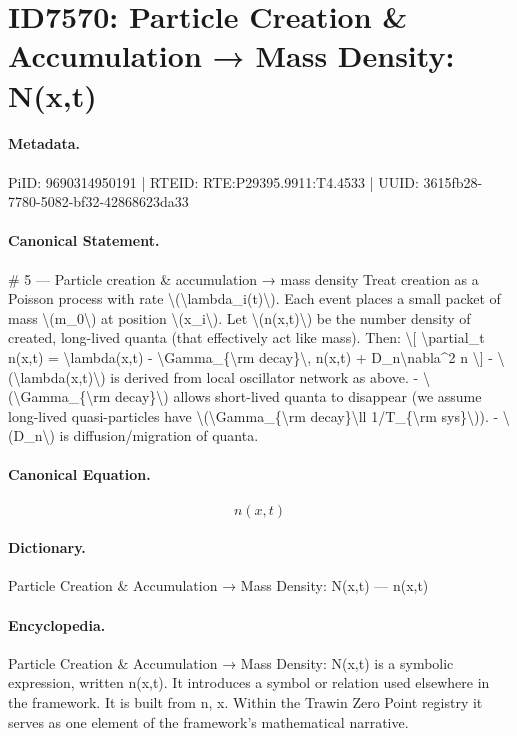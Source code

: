 \section*{ID7570: Particle Creation \& Accumulation → Mass Density: N(x,t)}
\paragraph{Metadata.}
PiID: 9690314950191 | RTEID: RTE:P29395.9911:T4.4533 | UUID: 3615fb28-7780-5082-bf32-42868623da33

\paragraph{Canonical Statement.}
\# 5 — Particle creation \& accumulation → mass density Treat creation as a Poisson process with rate \textbackslash{}(\textbackslash{}lambda\_i(t)\textbackslash{}). Each event places a small packet of mass \textbackslash{}(m\_0\textbackslash{}) at position \textbackslash{}(x\_i\textbackslash{}). Let \textbackslash{}(n(x,t)\textbackslash{}) be the number density of created, long-lived quanta (that effectively act like mass). Then: \textbackslash{}[ \textbackslash{}partial\_t n(x,t) = \textbackslash{}lambda(x,t) - \textbackslash{}Gamma\_\{\textbackslash{}rm decay\}\textbackslash{}, n(x,t) + D\_n\textbackslash{}nabla\textasciicircum{}2 n \textbackslash{}] - \textbackslash{}(\textbackslash{}lambda(x,t)\textbackslash{}) is derived from local oscillator network as above. - \textbackslash{}(\textbackslash{}Gamma\_\{\textbackslash{}rm decay\}\textbackslash{}) allows short-lived quanta to disappear (we assume long-lived quasi-particles have \textbackslash{}(\textbackslash{}Gamma\_\{\textbackslash{}rm decay\}\textbackslash{}ll 1/T\_\{\textbackslash{}rm sys\}\textbackslash{})). - \textbackslash{}(D\_n\textbackslash{}) is diffusion/migration of quanta.

\paragraph{Canonical Equation.}
\[
n(x,t)
\]

\paragraph{Dictionary.}
Particle Creation \& Accumulation → Mass Density: N(x,t) — n(x,t)

\paragraph{Encyclopedia.}
Particle Creation \& Accumulation → Mass Density: N(x,t) is a symbolic expression, written n(x,t). It introduces a symbol or relation used elsewhere in the framework. It is built from n, x. Within the Trawin Zero Point registry it serves as one element of the framework's mathematical narrative.

